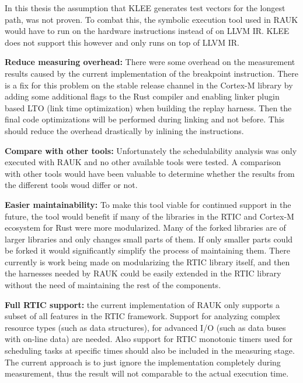 In this thesis the assumption that KLEE generates test vectors for the longest
path, was not proven. To combat this, the symbolic execution tool used in RAUK
would have to run on the hardware instructions instead of on LLVM IR. KLEE does
not support this however and only runs on top of LLVM IR.

\textbf{Reduce measuring overhead:} There were some overhead on the measurement
results caused by the current implementation of the breakpoint instruction.
There is a fix for this problem on the stable release channel in the Cortex-M
library by adding some additional flags to the Rust compiler and enabling
linker plugin based LTO (link time optimization) when building the replay
harness. Then the final code optimizations will be performed during linking
and not before. This should reduce the overhead drastically by inlining the
instructions.

\textbf{Compare with other tools:} Unfortunately the schedulability analysis
was only executed with RAUK and no other available tools were tested. A
comparison with other tools would have been valuable to determine whether the
results from the different tools woud differ or not.

\textbf{Easier maintainability:} To make this tool viable for continued support
in the future, the tool would benefit if many of the libraries in the RTIC and
Cortex-M ecosystem for Rust were more modularized. Many of the forked libraries
are of larger libraries and only changes small parts of them. If only smaller
parts could be forked it would significantly simplify the process of
maintaining them. There currently is work being made on modularizing the RTIC
library itself, and then the harnesses needed by RAUK could be easily extended
in the RTIC library without the need of maintaining the rest of the components.

\textbf{Full RTIC support:} the current implementation of RAUK only supports
a subset of all features in the RTIC framework. Support for analyzing complex
resource types (such as data structures), for advanced I/O (such as data
buses with on-line data) are needed. Also support for RTIC monotonic timers used
for scheduling tasks at specific times should also be included in the measuring
stage. The current approach is to just ignore the implementation completely
during measurement, thus the result will not comparable to the actual execution
time.


